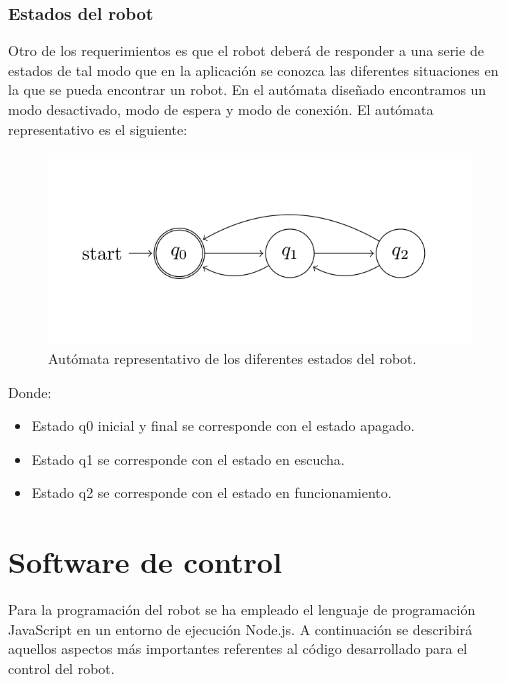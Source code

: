 \subsubsection{Estados del robot}

Otro de los requerimientos es que el robot deberá de responder a una serie de estados de tal modo que en la aplicación se conozca las diferentes situaciones en la que se pueda encontrar un robot.
En el autómata diseñado encontramos un modo desactivado, modo de espera y modo de conexión. El autómata representativo es el siguiente:\\

\begin{figure}[H]
  \begin{center}
    \includegraphics[scale=0.6]{imagenes/robot/automata-estados.png}
  \end{center}
  \caption{Autómata representativo de los diferentes estados del robot.}
  \label{figura:automata-estados}
\end{figure}

Donde:\\

\begin{itemize}
  \item Estado q0 inicial y final se corresponde con el estado apagado.
 \item Estado q1 se corresponde con el estado en escucha.
 \item Estado q2 se corresponde con el estado en funcionamiento.
\end{itemize}


\section{Software de control}
 
Para la programación del robot se ha empleado el lenguaje de programación JavaScript en un entorno de ejecución Node.js. A continuación se describirá aquellos aspectos más importantes
referentes al código desarrollado para el control del robot.\\

